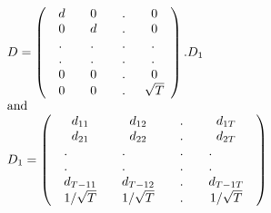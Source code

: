 \documentclass[preprint,authoryear,12pt]{elsarticle}
\begin{document}
$$
\begin{array}{l}
 D = \left( {\begin{array}{*{20}c}
   d & 0 & . & 0  \\
   0 & d & . & 0  \\
   \begin{array}{l}
 . \\
 . \\
 0 \\
 \end{array} & \begin{array}{l}
 . \\
 . \\
 0 \\
 \end{array} & \begin{array}{l}
 . \\
 . \\
 . \\
 \end{array} & \begin{array}{l}
 . \\
 . \\
 0 \\
 \end{array}  \\
   0 & 0 & . & {\sqrt T }  \\
\end{array}} \right).D_1  \\
 {\rm{and}}\; \\
 D_1  = \left( {\begin{array}{*{20}c}
   {d_{11} } & {d_{12} } & . & {d_{1T} }  \\
   {d_{21} } & {d_{22} } & . & {d_{2T} }  \\
   \begin{array}{l}
 . \\
 . \\
 d_{T - 11}  \\
 \end{array} & \begin{array}{l}
 . \\
 . \\
 d_{T - 12}  \\
 \end{array} & \begin{array}{l}
 . \\
 . \\
 . \\
 \end{array} & \begin{array}{l}
 . \\
 . \\
 d_{T - 1T}  \\
 \end{array}  \\
   {1/\sqrt T } & {1/\sqrt T } & . & {1/\sqrt T }  \\
\end{array}} \right) \\
 \end{array}
$$
\end{document}
